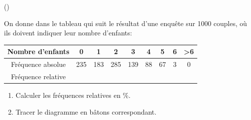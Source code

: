 \begin{exercice}\label{exo1-1} (\minsyndical)

On donne dans le tableau qui suit le r\'esultat d'une enqu\^ete sur 1000 couples, o\`u ils doivent
indiquer leur nombre d'enfants:\\

\begin{tabular}{|c|cccccccc|}
\hline
Nombre d'enfants & 0 & 1 & 2 & 3 & 4 & 5 & 6 & >6 \\ \hline
Fr\'equence absolue & 235 & 183 & 285 & 139 & 88 & 67 & 3 & 0\\ \hline
Fr\'equence relative & & & & & & & &\\ \hline
\end{tabular}

\begin{enumerate}
\item Calculer les fr\'equences relatives en \%.
\item Tracer le diagramme en b\^atons correspondant.
\end{enumerate}


\end{exercice}
